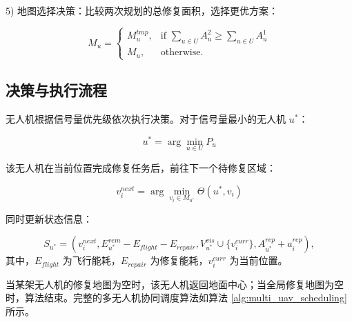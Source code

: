 \documentclass[AutoFakeBold]{LZUThesis}
\begin{document}
5) 地图选择决策：比较两次规划的总修复面积，选择更优方案：

\begin{equation}
	M_u =
	\begin{cases}
		M_u^{tmp}, & \text{if } \sum_{u \in U} A_u^2 \geq \sum_{u \in U} A_u^1 \\
		M_u,       & \text{otherwise}.
	\end{cases}
\end{equation}

\subsection{决策与执行流程}

无人机根据信号量优先级依次执行决策。对于信号量最小的无人机 $u^*$：

\begin{equation}
	u^* = \arg\min_{u \in U} P_u
\end{equation}

该无人机在当前位置完成修复任务后，前往下一个待修复区域：

\begin{equation}
	v_i^{next} = \arg\min_{v_i \in M_{u^*}} \Theta(u^*,v_i)
\end{equation}

同时更新状态信息：

\begin{equation}
	S_{u^*} = (v_i^{next}, E_{u^*}^{rem} - E_{flight} - E_{repair}, V_{u^*}^{vis} \cup \{v_i^{curr}\}, A_{u^*}^{rep} + a_i^{rep}),
\end{equation}
其中，$E_{flight}$ 为飞行能耗，$E_{repair}$ 为修复能耗，$v_i^{curr}$ 为当前位置。

当某架无人机的修复地图为空时，该无人机返回地面中心；当全局修复地图为空时，算法结束。完整的多无人机协同调度算法如算法 \ref{alg:multi_uav_scheduling} 所示。
\end{document}
